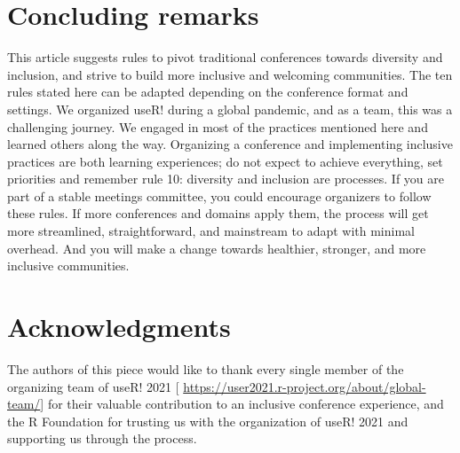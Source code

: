 \documentclass[10pt,letterpaper]{article}
\begin{document}

\section*{Concluding remarks}

This article suggests rules to pivot traditional conferences towards diversity and inclusion, and strive to build more inclusive and welcoming communities. 
The ten rules stated here can be adapted depending on the conference format and settings.
We organized useR! during a global pandemic, and as a team, this was a challenging journey. 
We engaged in most of the practices mentioned here and learned others along the way. 
Organizing a conference and implementing inclusive practices are both learning experiences;
do not expect to achieve everything, set priorities and remember rule 10: diversity and inclusion are processes. 
If you are part of a stable meetings committee, you could encourage organizers to follow these rules. 
If more conferences and domains apply them, the process will get more streamlined, straightforward, and mainstream to adapt with minimal overhead.
And you will make a change towards healthier, stronger, and more inclusive communities.


\section*{Acknowledgments}
The authors of this piece would like to thank every single member of the organizing team of useR! 2021 [ \url{https://user2021.r-project.org/about/global-team/}] for their valuable contribution to an inclusive conference experience, and the R Foundation for trusting us with the organization of useR! 2021 and supporting us through the process. 
\end{document}
